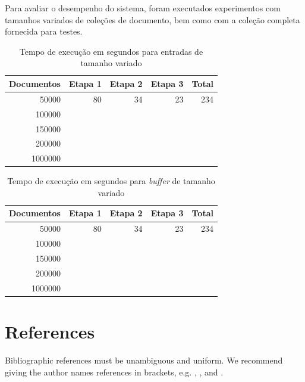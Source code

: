 \documentclass[12pt]{article}
\begin{document}
Para avaliar o desempenho do sistema, foram executados experimentos com tamanhos variados de coleções de documento, bem como com a coleção completa fornecida para testes.


\begin{table}[ht]
\centering
\caption{Tempo de execução em segundos para entradas de tamanho variado}
\label{tab:exec_time_collection}
\begin{tabular}{rrrrr}
Documentos & Etapa 1 & Etapa 2 & Etapa 3 & Total \\ \hline
50000      & 80      & 34      & 23      & 234   \\
100000     & ~       & ~       & ~       & ~     \\
150000     & ~       & ~       & ~       & ~     \\
200000     & ~       & ~       & ~       & ~     \\
1000000    & ~       & ~       & ~       & ~     \\
\end{tabular}
\end{table}


\begin{table}[ht]
\centering
\caption{Tempo de execução em segundos para \emph{buffer} de tamanho variado}
\label{tab:exec_time_buffer}
\begin{tabular}{rrrrr}
Documentos & Etapa 1 & Etapa 2 & Etapa 3 & Total \\ \hline
50000      & 80      & 34      & 23      & 234   \\
100000     & ~       & ~       & ~       & ~     \\
150000     & ~       & ~       & ~       & ~     \\
200000     & ~       & ~       & ~       & ~     \\
1000000    & ~       & ~       & ~       & ~     \\
\end{tabular}
\end{table}




\section{References}

Bibliographic references must be unambiguous and uniform.  We recommend giving
the author names references in brackets, e.g. \cite{knuth:84},
\cite{boulic:91}, and \cite{smith:99}.




\end{document}

